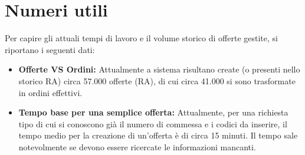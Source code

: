 \section{Numeri utili}
Per capire gli attuali tempi di lavoro e il volume storico di offerte gestite, si riportano i seguenti dati:
\begin{itemize}
      \item \textbf{Offerte VS Ordini:} Attualmente a sistema risultano create (o presenti nello storico \ac{RA})
            circa 57.000 offerte (\ac{RA}), di cui circa 41.000 si sono trasformate in ordini effettivi.
      \item \textbf{Tempo base per una semplice offerta:} Attualmente, per una richiesta tipo di cui si conoscono già
            il numero di commessa e i codici da inserire, il tempo medio per la creazione di un'offerta è di circa 15 minuti.
            Il tempo sale notevolmente se devono essere ricercate le informazioni mancanti.
\end{itemize}